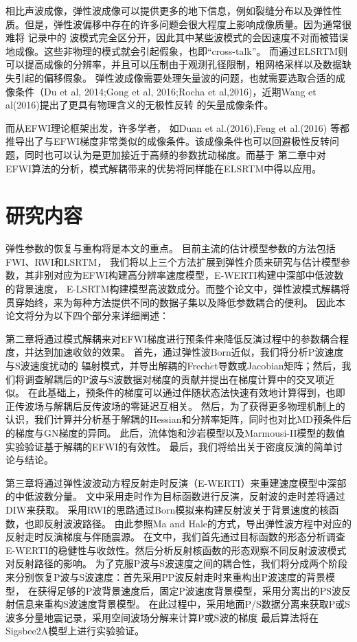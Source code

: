 相比声波成像，弹性波成像可以提供更多的地下信息，例如裂缝分布以及弹性性质。但是，弹性波偏移中存在的许多问题会很大程度上影响成像质量。因为通常很难将
记录中的 
波模式完全区分开，因此其中某些波模式的会因速度不对而被错误地成像。这些非物理的模式就会引起假象，也即“cross-talk”。
而通过ELSRTM则可以提高成像的分辨率，并且可以压制由于观测孔径限制，粗网格采样以及数据缺失引起的偏移假象。
弹性波成像需要处理矢量波的问题，也就需要选取合适的成像条件（Du et al, 2014\cite{DuEtAl2014};Gong et
al, 2016\cite{GongEtAl2016};Rocha et al,2016\cite{RochaEtAl2016a})，近期Wang et
al(2016)\cite{WangEtAl2016}提出了更具有物理含义的无极性反转
的矢量成像条件。

而从EFWI理论框架出发，许多学者，
如Duan et al.(2016)\cite{Duan2016},Feng et
al.(2016)\cite{Feng2016}
等都推导出了与EFWI梯度非常类似的成像条件。该成像条件也可以回避极性反转问题，同时也可以认为是更加接近于高频的参数扰动梯度。而基于
第二章中对EFWI算法的分析，模式解耦带来的优势将同样能在ELSRTM中得以应用。


\section{研究内容}
弹性参数的恢复与重构将是本文的重点。
目前主流的估计模型参数的方法包括FWI、RWI和LSRTM，
我们将以上三个方法扩展到弹性介质来研究与估计模型参数，其非别对应为EFWI构建高分辨率速度模型，E-WERTI构建中深部中低波数的背景速度，
E-LSRTM构建模型高波数成分。而整个论文中，弹性波模式解耦将贯穿始终，来为每种方法提供不同的数据子集以及降低参数耦合的便利。
因此本论文将分为以下四个部分来详细阐述：

第二章将通过模式解耦来对EFWI梯度进行预条件来降低反演过程中的参数耦合程度，并达到加速收敛的效果。
首先，通过弹性波Born近似，我们将分析P波速度与S波速度扰动的
辐射模式，并导出解耦的Frech{$\acute{e}$}t导数或Jacobian矩阵；然后，我们将调查解耦后的P波与S波数据对梯度的贡献并提出在梯度计算中的交叉项近似。
在此基础上，预条件的梯度可以通过伴随状态法\cite[]{plessix2006}快速有效地计算得到，也即正传波场与解耦后反传波场的零延迟互相关。
然后，为了获得更多物理机制上的认识，我们计算并分析基于解耦的Hessian和分辨率矩阵，同时也对比MD预条件后的梯度与GN梯度的异同。
此后，流体饱和沙岩模型以及Marmousi-II模型的数值实验验证基于解耦的EFWI的有效性。
最后，我们将给出关于密度反演的简单讨论与结论。

第三章将通过弹性波波动方程反射走时反演（E-WERTI）来重建速度模型中深部的中低波数分量。
文中采用走时作为目标函数进行反演，反射波的走时差将通过DIW来获取。
采用RWI的思路通过Born模拟来构建反射波关于背景速度的核函数，也即反射波波路径。
由此参照Ma and Hale\cite{ma2013}的方式，导出弹性波方程中对应的反射走时反演梯度与伴随震源。
在文中，我们首先通过目标函数的形态分析调查E-WERTI的稳健性与收敛性。然后分析反射核函数的形态观察不同反射波波模式对反射路径的影响。
为了克服P波与S波速度之间的耦合性，我们将分成两个阶段来分别恢复P波与S波速度：首先采用PP波反射走时来重构出P波速度的背景模型，
在获得足够的P波背景速度后，固定P波速度背景模型，采用分离出的PS波反射信息来重构S波速度背景模型。
在此过程中，采用地面P/S数据分离来获取P或S波多分量地震记录，采用空间波场分解来计算P或S波的梯度
最后算法将在Sigsbee2A模型上进行实验验证。

